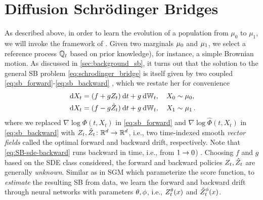\section{Diffusion Schr{\"o}dinger Bridges}
\label{sec:background_dsb}

As described above, in order to learn the evolution of a population from $\mu_0$ to $\mu_1$, we will invoke the framework of .
Given two marginals $\mu_0$ and $\mu_1$, we select a reference process $\mathbb{Q}_{ t }$ based on prior knowledge), for instance, a simple Brownian motion. As discussed in \cref{sec:background_sb}, it turns out that  the solution to the general \acrshort{SB} problem \eqref{eq:schrodinger_bridge} is itself given by two coupled  \eqref{eq:sb_forward}-\eqref{eq:sb_backward} \citep{leonard2013survey}, which we restate her for convenience
\begin{eqnarray}
\label{eq:SB-sde-forward}
\dsde &= \parens*{\tdriftbase +  \volatbase \SBfbase_\ctime} \dt + \volatbase \dWiener[\ctime],\quad \sde[0] \sim \distinit, \\ %
\label{eq:SB-sde-backward}
\dsde &= \parens{\tdriftbase -  \volatbase \SBbbase_\ctime} \dt + \volatbase \dWiener[\ctime],\quad \sde[\horizon] \sim \distend\,. %
\end{eqnarray}
where we replaced $\nabla \log \Phi\left(t, X_t\right)$ in \eqref{eq:sb_forward} and $\nabla \log \widehat{\Phi}\left(t, X_t\right)$ in \eqref{eq:sb_backward} with $Z_t, \hat{Z}_t \colon \mathbb{R}^d \to \mathbb{R}^d$, i.e., two time-indexed smooth \emph{vector fields} called the optimal forward and backward drift, respectively. Note that \eqref{eq:SB-sde-backward} runs backward in time, i.e., from $1 \to 0$) \citep{anderson1982reverse}. %
Choosing $f$ and $g$ based on the SDE class considered, the forward and backward policies $Z_t, \hat{Z}_t$ are generally \emph{unknown}.
Similar as in \acrfull{SGM} \citep{song2020score, hyvarinen2005estimation} which parameterize the score function, to \emph{estimate} the resulting \acrshort{SB} from data, we learn the forward and backward drift through neural networks with parameters $\theta, \phi$, i.e., $\SBf$ and $\SBb$. \\

